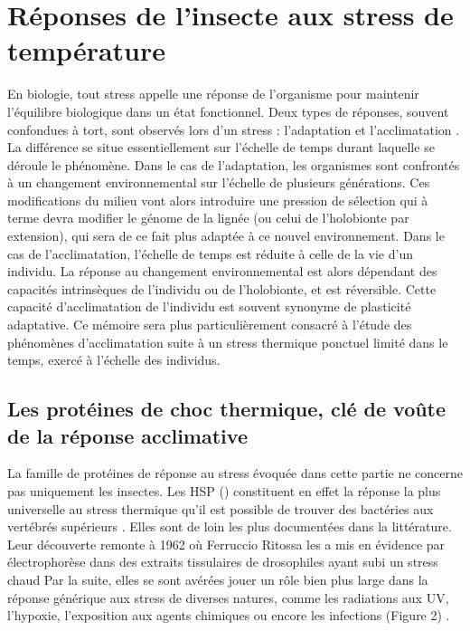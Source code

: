 \section{Réponses de l'insecte aux stress de température}

En biologie, tout stress appelle une réponse de l'organisme pour maintenir l'équilibre biologique dans un état fonctionnel.
Deux types de réponses, souvent confondues à tort, sont observés lors d'un stress : l'adaptation et l'acclimatation \cite{somero2010}.
La différence se situe essentiellement sur l'échelle de temps durant laquelle se déroule le phénomène.
Dans le cas de l'adaptation, les organismes sont confrontés à un changement environnemental sur l'échelle de plusieurs générations.
Ces modifications du milieu vont alors introduire une pression de sélection qui à terme devra modifier le génome de la lignée (ou celui de l'holobionte par extension), qui sera de ce fait plus adaptée à ce nouvel environnement.
Dans le cas de l'acclimatation, l'échelle de temps est réduite à celle de la vie d'un individu. La réponse au changement environnemental est alors dépendant des capacités intrinsèques de l'individu ou de l'holobionte, et est réversible.
Cette capacité d'acclimatation de l'individu est souvent synonyme de plasticité adaptative.
Ce mémoire sera plus particulièrement consacré à l'étude des phénomènes d'acclimatation suite à un stress thermique ponctuel limité dans le temps, exercé à l'échelle des individus.

	\subsection{Les protéines de choc thermique, clé de voûte de la réponse acclimative}

	La famille de protéines de réponse au stress évoquée dans cette partie ne concerne pas uniquement les insectes.
	Les HSP () constituent en effet la réponse la plus universelle au stress thermique qu'il est possible de trouver des bactéries aux vertébrés supérieurs \cite{lindquist1986}.
	Elles sont de loin les plus documentées dans la littérature.
	Leur découverte remonte à 1962 où Ferruccio Ritossa les a mis en évidence par électrophorèse dans des extraits tissulaires de drosophiles ayant subi un stress chaud \cite{ritossa1996, ritossa1962} %
	Par la suite, elles se sont avérées jouer un rôle bien plus large dans la réponse générique aux stress de diverses natures, comme les radiations aux UV, l'hypoxie, l'exposition aux agents chimiques ou encore les infections (Figure 2) \cite{sorensen2003}.

